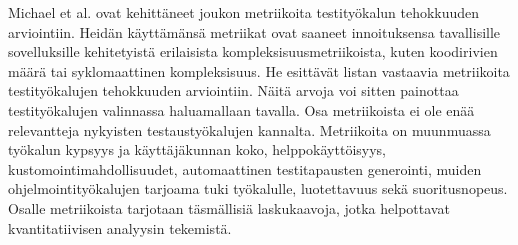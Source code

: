 Michael et al. \cite{michael02} ovat kehittäneet joukon metriikoita testityökalun tehokkuuden arviointiin. Heidän käyttämänsä metriikat ovat saaneet innoituksensa tavallisille sovelluksille kehitetyistä erilaisista kompleksisuusmetriikoista, kuten koodirivien määrä tai syklomaattinen kompleksisuus. He esittävät listan vastaavia metriikoita testityökalujen tehokkuuden arviointiin. Näitä arvoja voi sitten painottaa testityökalujen valinnassa haluamallaan tavalla. Osa metriikoista ei ole enää relevantteja nykyisten testaustyökalujen kannalta. Metriikoita on muunmuassa työkalun kypsyys ja käyttäjäkunnan koko, helppokäyttöisyys, kustomointimahdollisuudet, automaattinen testitapausten generointi, muiden ohjelmointityökalujen tarjoama tuki työkalulle, luotettavuus sekä suoritusnopeus. Osalle metriikoista tarjotaan täsmällisiä laskukaavoja, jotka helpottavat kvantitatiivisen analyysin tekemistä.

